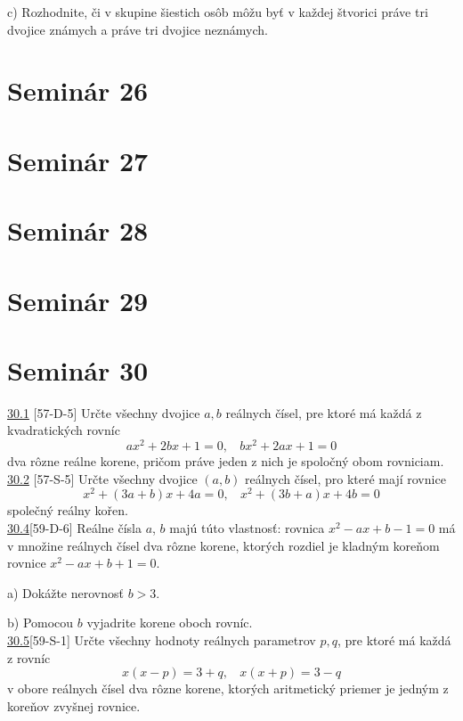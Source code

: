 c) Rozhodnite, či v skupine šiestich osôb môžu byť v každej štvorici práve tri dvojice známych a práve tri dvojice neznámych.\\

\section*{Seminár 26}

\section*{Seminár 27}

\section*{Seminár 28}

\section*{Seminár 29}

\section*{Seminár 30}
\noindent \ul{30.1} [57-D-5] \ToDo Určte všechny dvojice $a, b$ reálnych čísel, pre ktoré má každá z
kvadratických rovníc
$$ax^2 + 2bx + 1 = 0, \ \ \ \ bx^2 + 2ax + 1 = 0$$
dva rôzne reálne korene, pričom práve jeden z nich je spoločný obom rovniciam.\\

\noindent \ul{30.2} [57-S-5] \ToDo
Určte všechny dvojice $(a, b)$ reálnych čísel, pro které mají rovnice
$$x^2 + (3a + b)x + 4a = 0, \ \ \ \  x^2 + (3b + a)x + 4b = 0$$
společný reálny kořen.\\

\noindent \ul{30.4}[59-D-6] Reálne čísla $a$, $b$ majú túto vlastnosť: rovnica $x^2 -ax+b-1 = 0$ má v množine reálnych čísel dva rôzne korene, ktorých rozdiel je kladným koreňom rovnice $x^2 - ax + b + 1 = 0$.

a) Dokážte nerovnosť $b > 3$.

b) Pomocou $b$ vyjadrite korene oboch rovníc.\\

\noindent \ul{30.5}[59-S-1] Určte všechny hodnoty reálnych parametrov $p, q$, pre ktoré má každá z rovníc
$$x(x - p) = 3 + q, \ \ \ \ x(x + p) = 3 - q$$
v obore reálnych čísel dva rôzne korene, ktorých aritmetický priemer je jedným z koreňov
zvyšnej rovnice.\\

